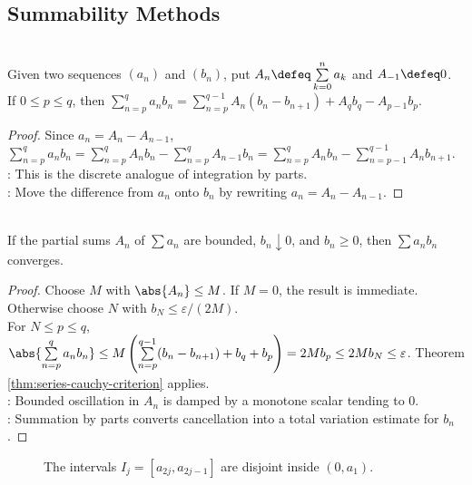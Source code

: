 \subsection{Summability Methods}

\begin{theorem} \label{thm:summation-by-parts} \\
Given two sequences $(a_n)$ and $(b_n)$, put $A_n\defeq\sum\limits_{k=0}^{n}a_k$ and $A_{-1}\defeq0$.\\
If $0\leq p\leq q$, then $\sum\limits_{n=p}^{q}a_nb_n=\sum\limits_{n=p}^{q-1}A_n(b_n-b_{n+1})+A_qb_q-A_{p-1}b_p$.
\begin{proof}
Since $a_n=A_n-A_{n-1}$, $\sum\limits_{n=p}^{q}a_nb_n=\sum\limits_{n=p}^{q}A_nb_n-\sum\limits_{n=p}^{q}A_{n-1}b_n =\sum\limits_{n=p}^{q}A_nb_n-\sum\limits_{n=p-1}^{q-1}A_nb_{n+1}$.\\
: This is the discrete analogue of integration by parts.\\
: Move the difference from $a_n$ onto $b_n$ by rewriting $a_n=A_n-A_{n-1}$.
\end{proof}
\end{theorem}

\begin{theorem} \label{thm:dirichlet-test-series} \\
If the partial sums $A_n$ of $\sum a_n$ are bounded, $b_n\downarrow0$, and $b_n\geq0$, then $\sum a_nb_n$ converges.
\begin{proof}
Choose $M$ with $\abs{A_n}\leq M$. If $M=0$, the result is immediate. Otherwise choose $N$ with $b_N\leq\varepsilon/(2M)$.\\
For $N\leq p\leq q$, $\abs{\sum\limits_{n=p}^{q}a_nb_n}\leq M\left(\sum\limits_{n=p}^{q-1}(b_n-b_{n+1})+b_q+b_p\right)=2Mb_p\leq2Mb_N\leq\varepsilon$. Theorem \ref{thm:series-cauchy-criterion} applies.\\
: Bounded oscillation in $A_n$ is damped by a monotone scalar tending to $0$.\\
: Summation by parts converts cancellation into a total variation estimate for $b_n$.
\end{proof}
\end{theorem}

\begin{figure}[H]
  \centering
  
  \caption{The intervals $I_j=[a_{2j},a_{2j-1}]$ are disjoint inside $(0,a_1)$.}
  \label{fig:alternating-series-intervals}
\end{figure}


